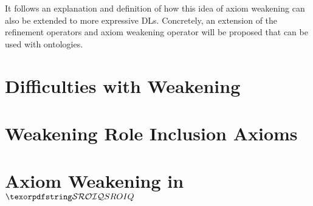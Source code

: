
It follows an explanation and definition of how this idea of axiom weakening can also be extended to more expressive DLs. Concretely, an extension of the refinement operators and axiom weakening operator will be proposed that can be used with \SROIQ ontologies.

\section{Difficulties with Weakening \SROIQ} \label{expressivity-problems}



\section{Weakening Role Inclusion Axioms} \label{rbox-weakening}



\section{Axiom Weakening in \texorpdfstring{$\SROIQ$}{SROIQ}} \label{weakening-sroiq}


